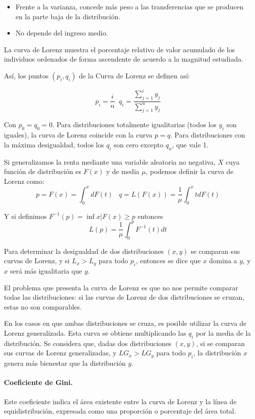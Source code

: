 \begin{itemize}
\item Frente a la varianza, concede m\'as peso a las transferencias que se producen en la parte baja de la distribuci\'on.
\item No depende del ingreso medio.
\end{itemize}


La curva de Lorenz muestra el porcentaje relativo de valor acumulado de los individuos ordenados de forma ascendente de acuerdo a la magnitud estudiada.

As\'i, los puntos $(p_i,q_i)$ de la Curva de Lorenz se definen as\'i:

\[p_i=\dfrac{i}{n} \;\; q_i=\dfrac{\sum_{j=1}^iy_j}{\sum_{j=1}^ny_j}\]

Con $p_0=q_0=0$. Para distribuciones totalmente igualitarias (todos los $y_i$ son iguales), la curva de Lorenz coincide con la curva $p=q$. Para distribuciones con la m\'axima desigualdad, todos los $q_i$ son cero excepto $q_n$, que vale 1.

Si generalizamos la renta mediante una variable aleatoria no negativa, $X$ cuya funci\'on de distribuci\'on es $F(x)$ y de media $\mu$, podemos definir la curva de Lorenz como:
\[p=F(x)=\int_0^xdF(t)\;\;\; q=L(F(x))=\dfrac{1}{\mu}\int_0^xtdF(t)\]

Y si definimos $F^{-1}(p)=\inf{x|F(x)\geq p}$ entonces
\[L(p)=\dfrac{1}{\mu}\int_0^pF^{-1}(t)dt\]

Para determinar la desigualdad de dos distribuciones $(x,y)$ se comparan sus curvas de Lorenz, y si $L_x>L_y$ para todo $p_i$, entonces se dice que $x$ domina a $y$, y $x$ ser\'a m\'as igualitaria que $y$.

El problema que presenta la curva de Lorenz es que no nos permite comparar todas las distribuciones: si las curvas de Lorenz de dos distribuciones se cruzan, estas no son comparables.

En los casos en que ambas distribuciones se cruza, es posible utilizar la curva de Lorenz generalizada. Esta curva se obtiene multiplicando las $q_i$ por la media de la distribuci\'on. Se considera que, dadas dos distribuciones $(x,y)$, si se comparan sus curvas de Lorenz generalizadas, y  $LG_x>LG_y$ para todo $p_i$, la distribuci\'on $x$ genera m\'as bienestar que la distribuci\'on $y$.

\paragraph{Coeficiente de Gini.}

Este coeficiente indica el \'area existente entre la curva de Lorenz y la l\'inea de equidistribuci\'on, expresada como una proporci\'on o porcentaje del \'area total.



